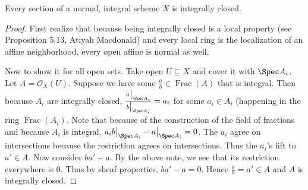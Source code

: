 \begin{lem}\label{lem:normally_local}
	Every section of a normal, integral scheme $X $ is integrally closed.
\end{lem}
\begin{proof}
	First realize that because being integrally closed is a local property (see Proposition 5.13, Atiyah Macdonald) and every local ring is the localization of an affine neighborhood, every open affine is normal as well.

	Now to show it for all open sets.
	Take open $U \subseteq X $ and cover it with $\Spec A_i $.
	Let $A = \mathcal{O}_X(U) $.
	Suppose we have some $\frac{a}{b} \in \operatorname{Frac}(A)$ that is integral.
	Then because $A_i $ are integrally closed, $\frac{a\big|_{\Spec A_i}}{b\big|_{\Spec A_i}} = a_i $ for some $a_i \in A_i$ (happening in the ring $\operatorname{Frac}(A_i) $.
	Note that because of the construction of the field of fractions and because $A_i$ is integral, $a_ib\big|_{\Spec A_i} - a\big|_{\Spec A_i} = 0 $.
	The $a_i $ agree on intersections because the restriction agrees on intersections.
	Thus the $a_i $'s lift to $a' \in A $.
	Now consider $ba' - a $.
	By the above note, we see that its restriction everywhere is 0.
	Thus by sheaf properties, $ba' -a = 0 $.
	Hence $\frac{a}{b} = a' \in A$ and $A $ is integrally closed.
\end{proof}

